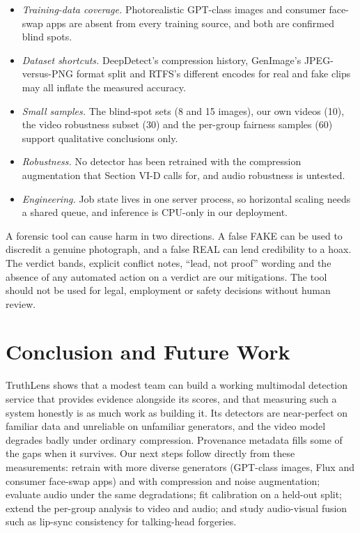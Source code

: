 \documentclass[conference]{IEEEtran}
\begin{document}
\begin{itemize}
\item \emph{Training-data coverage.} Photorealistic GPT-class images and consumer face-swap apps are absent from every training source, and both are confirmed blind spots.
\item \emph{Dataset shortcuts.} DeepDetect's compression history, GenImage's JPEG-versus-PNG format split and RTFS's different encodes for real and fake clips may all inflate the measured accuracy.
\item \emph{Small samples.} The blind-spot sets (8 and 15 images), our own videos (10), the video robustness subset (30) and the per-group fairness samples (60) support qualitative conclusions only.
\item \emph{Robustness.} No detector has been retrained with the compression augmentation that Section VI-D calls for, and audio robustness is untested.
\item \emph{Engineering.} Job state lives in one server process, so horizontal scaling needs a shared queue, and inference is CPU-only in our deployment.
\end{itemize}

A forensic tool can cause harm in two directions. A false FAKE can be used to discredit a genuine photograph, and a false REAL can lend credibility to a hoax. The verdict bands, explicit conflict notes, ``lead, not proof'' wording and the absence of any automated action on a verdict are our mitigations. The tool should not be used for legal, employment or safety decisions without human review.


\section{Conclusion and Future Work}
TruthLens shows that a modest team can build a working multimodal detection service that provides evidence alongside its scores, and that measuring such a system honestly is as much work as building it. Its detectors are near-perfect on familiar data and unreliable on unfamiliar generators, and the video model degrades badly under ordinary compression. Provenance metadata fills some of the gaps when it survives. Our next steps follow directly from these measurements: retrain with more diverse generators (GPT-class images, Flux and consumer face-swap apps) and with compression and noise augmentation; evaluate audio under the same degradations; fit calibration on a held-out split; extend the per-group analysis to video and audio; and study audio-visual fusion such as lip-sync consistency for talking-head forgeries.
\end{document}
